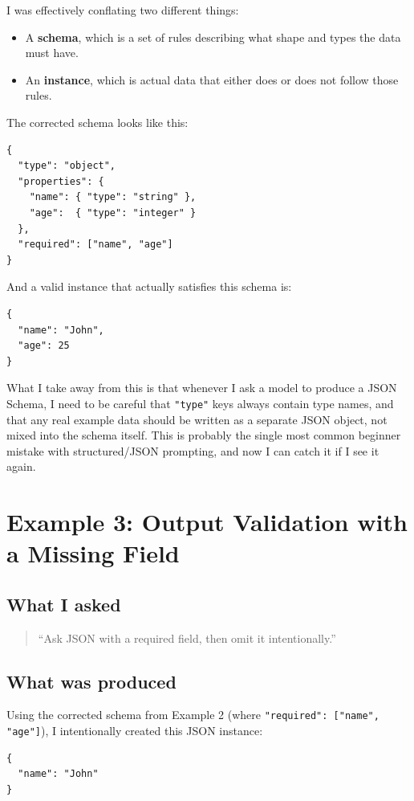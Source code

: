 \documentclass[11pt]{article}
\begin{document}
I was effectively conflating two different things:
\begin{itemize}
  \item A \textbf{schema}, which is a set of rules describing what shape and types the data must have.
  \item An \textbf{instance}, which is actual data that either does or does not follow those rules.
\end{itemize}

The corrected schema looks like this:
\begin{lstlisting}
{
  "type": "object",
  "properties": {
    "name": { "type": "string" },
    "age":  { "type": "integer" }
  },
  "required": ["name", "age"]
}
\end{lstlisting}

And a valid instance that actually satisfies this schema is:
\begin{lstlisting}
{
  "name": "John",
  "age": 25
}
\end{lstlisting}

What I take away from this is that whenever I ask a model to produce a JSON Schema, I need to be careful that \texttt{"type"} keys always contain type names, and that any real example data should be written as a separate JSON object, not mixed into the schema itself. This is probably the single most common beginner mistake with structured/JSON prompting, and now I can catch it if I see it again.

\section{Example 3: Output Validation with a Missing Field}

\subsection{What I asked}
\begin{quote}
``Ask JSON with a required field, then omit it intentionally.''
\end{quote}

\subsection{What was produced}
Using the corrected schema from Example 2 (where \texttt{"required": ["name", "age"]}), I intentionally created this JSON instance:
\begin{lstlisting}
{
  "name": "John"
}
\end{lstlisting}
\end{document}
